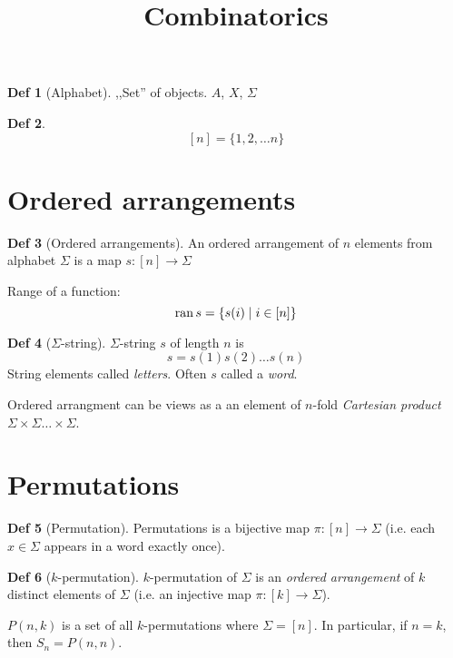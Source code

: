 \documentclass[a4paper]{article}
\title{Combinatorics}
\author{}
\theoremstyle{definition}
\newtheorem{definition}{Def}
\begin{document}
\maketitle

\begin{definition}[Alphabet]
  ,,Set'' of objects. \(A\), \(X\), \(\Sigma\)
\end{definition}

\begin{definition}
  \[[n] = \{1, 2, \ldots n\}\]
\end{definition}

\section{Ordered arrangements}

\begin{definition}[Ordered arrangements]
  An ordered arrangement of \(n\) elements from alphabet \(\Sigma\) is a map
  \(s : [n] \to \Sigma\)
\end{definition}

Range of a function:
\[\operatorname{ran} s = \{ s(i) \mid i \in [n] \}\]

\begin{definition}[\(\Sigma\)-string]
 \(\Sigma\)-string \(s\) of length \(n\) is
 \[ s = s(1) s(2) \ldots s(n) \]
 String elements called \textit{letters}.
 Often \(s\) called a \textit{word}.
\end{definition}

Ordered arrangment can be views as a an element of
\(n\)-fold \textit{Cartesian product}
\(\Sigma \times \Sigma \ldots \times \Sigma\).

\section{Permutations}
\begin{definition}[Permutation]
  Permutations is a bijective map \(\pi : [n] \to \Sigma\)
  (i.e. each \(x \in \Sigma\) appears in a word exactly once).
\end{definition}

\begin{definition}[\(k\)-permutation]
  \(k\)-permutation of \(\Sigma\) is an
  \textit{ordered arrangement} of \(k\) distinct elements of \(\Sigma\)
  (i.e. an injective map \(\pi : [k] \to \Sigma\)).
\end{definition}

\(P(n, k)\) is a set of all \(k\)-permutations where \(\Sigma = [n]\).
In particular, if \(n = k\), then \(S_n = P(n, n)\).
\end{document}
